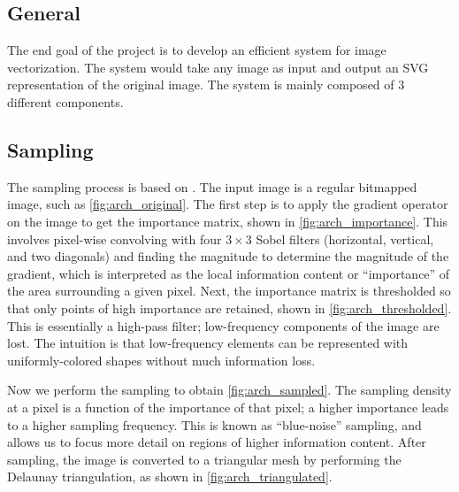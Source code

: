 \subsection{General}

The end goal of the project is to develop an efficient system for image vectorization. The system would take any image as input and output an SVG representation of the original image. The system is mainly composed of 3 different components.

\subsection{Sampling}

The sampling process is based on \cite{zhao2013image}. The input image is a regular bitmapped image, such as \cref{fig:arch_original}. The first step is to apply the gradient operator on the image to get the importance matrix, shown in \cref{fig:arch_importance}. This involves pixel-wise convolving with four $3\times 3$ Sobel filters (horizontal, vertical, and two diagonals) and finding the magnitude to determine the magnitude of the gradient, which is interpreted as the local information content or ``importance'' of the area surrounding a given pixel. Next, the importance matrix is thresholded so that only points of high importance are retained, shown in \cref{fig:arch_thresholded}. This is essentially a high-pass filter; low-frequency components of the image are lost. The intuition is that low-frequency elements can be represented with uniformly-colored shapes without much information loss.

Now we perform the sampling to obtain \cref{fig:arch_sampled}. The sampling density at a pixel is a function of the importance of that pixel; a higher importance leads to a higher sampling frequency. This is known as ``blue-noise'' sampling, and allows us to focus more detail on regions of higher information content. After sampling, the image is converted to a triangular mesh by performing the Delaunay triangulation, as shown in \cref{fig:arch_triangulated}.


